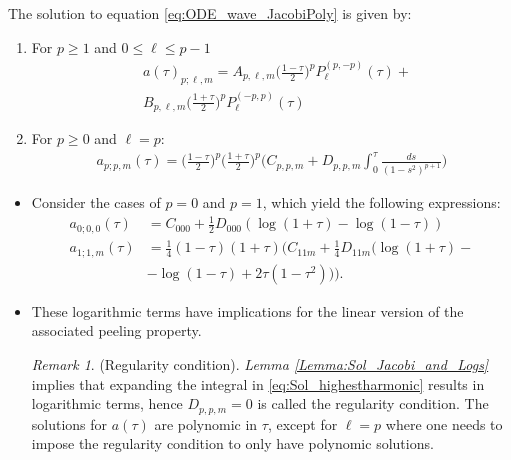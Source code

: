 \documentclass{beamer}
\theoremstyle{remark}
\newtheorem{remark}{Remark}
\theoremstyle{plain}
\theoremstyle{plain}
\begin{document}
\begin{frame}
  \begin{lemma}\label{Lemma:Sol_Jacobi_and_Logs} The solution to equation \eqref{eq:ODE_wave_JacobiPoly} is given
    by:
    \begin{enumerate}
    \item For $p\geq 1$ and $0\leq \ell \leq p-1$
     \begin{align}\label{eq:Sol_jac_poly}
      & a(\tau)_{p;\ell,m} =A_{p,\ell,m}\bigg(\frac{1-\tau}{2}\bigg)^{p}P_{\ell}^{(p,-p)}(\tau) + \nonumber \\
      & B_{p,\ell,m}\bigg(\frac{1+\tau}{2}\bigg)^{p}P_{\ell}^{(-p,p)}(\tau)
     \end{align}
    
    \item For $p\geq 0$ and $\ell=p$:
       \begin{align}\label{eq:Sol_highestharmonic}
        {a}_{p;p,m}(\tau) =\bigg(\frac{1-\tau}{2}\bigg)^{p}\bigg(\frac{1+\tau}{2}\bigg)^{p}\Bigg(C_{p,p,m}+D_{p,p,m}\int_{0}^{\tau} \frac{ds}{(1-s^2)^{p+1}}\Bigg)
       \end{align}
      \end{enumerate}
  \end{lemma}
\end{frame}

\begin{frame}
  \begin{itemize}
    \item Consider the cases of $p = 0$ and $p = 1$, which yield the following expressions:
    \begin{align}
      {a}_{0;0,0}(\tau) & = C_{000} + \tfrac{1}{2} D_{000} (\log(1 + \tau)- \log(1 - \tau ))\\ 
      {a}_{1;1,m}(\tau) & = \tfrac{1}{4} (1 - \tau )(1 + \tau ) (C_{11m} + \tfrac{1}{4} D_{11m}( \log(1 + \tau ) - \nonumber \\
      & -\log(1 - \tau ) + 2\tau(1-\tau^2))).
    \end{align}
    \item These logarithmic terms have implications for the linear version of the associated peeling property.
    \begin{remark}\label{Remark:logfreeRemark}(Regularity condition).
      \emph{Lemma \ref{Lemma:Sol_Jacobi_and_Logs}} implies that expanding the integral in \eqref{eq:Sol_highestharmonic} results in logarithmic terms, hence $D_{p,p,m} = 0$ is called the regularity condition. The solutions for
      $a(\tau)$ are polynomic in $\tau$, except for $\ell = p$ where one needs to impose the regularity condition to only have polynomic solutions.
    \end{remark}
  \end{itemize}
\end{frame}
\end{document}
